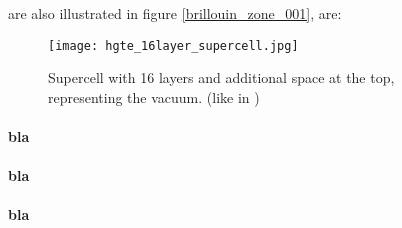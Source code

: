 are also illustrated in figure \ref{brillouin_zone_001},  are:
\begin{wrapfigure}{r}{0.3\linewidth}
	\centering
	\texttt{[image: hgte\_16layer\_supercell.jpg]}
				\caption{Supercell with 16 layers and additional space at the top, representing the vacuum. (like in \cite{Graz}) } \label{16layer_supercell}
\end{wrapfigure} 

\blindtext
\paragraph{bla}\blindtext\paragraph{bla}\blindtext\paragraph{bla}\blindtext\blindtext




